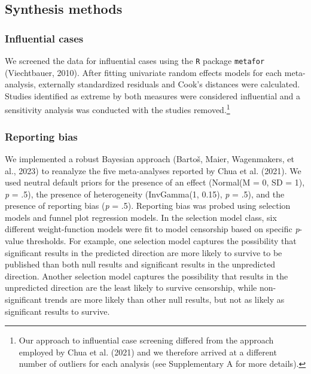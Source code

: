 \documentclass[
  man, donotrepeattitle,floatsintext]{apa7}
\begin{document}
\hypertarget{synthesis-methods}{%
\subsection{Synthesis methods}\label{synthesis-methods}}

\hypertarget{influential-cases}{%
\subsubsection{Influential cases}\label{influential-cases}}

We screened the data for influential cases using the \texttt{R} package \texttt{metafor} (Viechtbauer, 2010). After fitting univariate random effects models for each meta-analysis, externally standardized residuals and Cook's distances were calculated. Studies identified as extreme by both measures were considered influential and a sensitivity analysis was conducted with the studies removed.\footnote{Our approach to influential case screening differed from the approach employed by Chua et al. (2021) and we therefore arrived at a different number of outliers for each analysis (see Supplementary A for more details).}

\hypertarget{reporting-bias}{%
\subsubsection{Reporting bias}\label{reporting-bias}}

We implemented a robust Bayesian approach (Bartoš, Maier, Wagenmakers, et al., 2023) to reanalyze the five meta-analyses reported by Chua et al. (2021). We used neutral default priors for the presence of an effect (Normal(M = 0, SD = 1), \emph{p} = .5), the presence of heterogeneity (InvGamma(1, 0.15), \emph{p} = .5), and the presence of reporting bias (\emph{p} = .5). Reporting bias was probed using selection models and funnel plot regression models. In the selection model class, six different weight-function models were fit to model censorship based on specific \emph{p}-value thresholds. For example, one selection model captures the possibility that significant results in the predicted direction are more likely to survive to be published than both null results and significant results in the unpredicted direction. Another selection model captures the possibility that results in the unpredicted direction are the least likely to survive censorship, while non-significant trends are more likely than other null results, but not as likely as significant results to survive.
\end{document}
